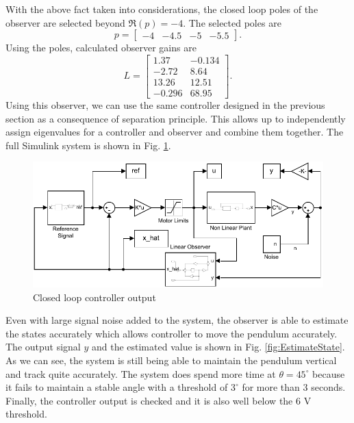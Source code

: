 \documentclass[superscriptaddress,floatfix,reprint,amssymb, amsmath,aps, pre]{revtex4-1}
\begin{document}
{{{            With the above fact taken into considerations, the closed loop poles of the observer are selected beyond \(\Re(p) = -4\). The selected poles are 
            \begin{equation}
                p = \begin{bmatrix}
                    -4 & -4.5 & -5 & -5.5 
                \end{bmatrix}.
            \end{equation}
            Using the poles, calculated observer gains are 
            \begin{equation}
                L  = \begin{bmatrix}
                    1.37  &-0.134 \\
                    -2.72 &   8.64\\
                    13.26  & 12.51\\
                    -0.296  & 68.95
                \end{bmatrix}.
            \end{equation}
            Using this observer, we can use the same controller designed in the previous section as a consequence of separation principle. This allows up to independently assign eigenvalues for a controller and observer and combine them together. The full Simulink system is shown in Fig. \ref{fig:linearSysWithO}. 
            \begin{figure}
                \includegraphics[width = \linewidth]{linearSysWithO.pdf}
                \caption{Closed loop controller output}
                \label{fig:linearSysWithO}
            \end{figure}
            Even with large signal noise added to the system, the observer is able to estimate the states accurately which allows controller to move the pendulum accurately. The output signal \(y\) and the estimated value is shown in Fig. \ref{fig:EstimateState}. As we can see, the system is still being able to maintain the pendulum vertical and track quite accurately. The system does spend more time at \(\theta = 45^\circ\) because it fails to maintain a stable angle with a threshold of \(3^\circ\) for more than 3 seconds. Finally, the controller output is checked and it is also well below the \(6\) V threshold.   
}}}
\end{document}
